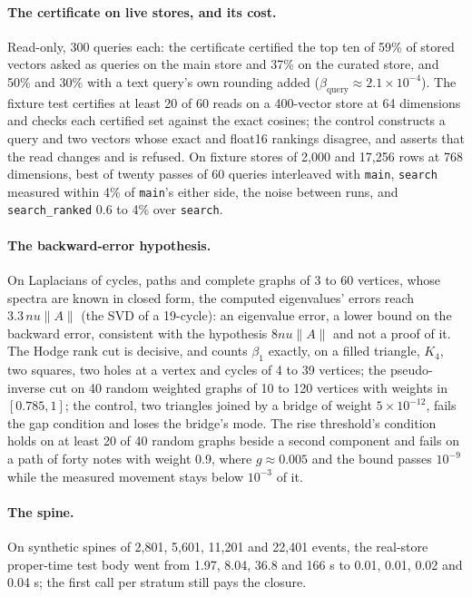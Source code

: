 \documentclass[11pt]{article}
\theoremstyle{plain}
\theoremstyle{definition}
\theoremstyle{remark}
\newcommand{\norm}[1]{\lVert #1 \rVert}
\newcommand{\betaQ}{\beta_{\mathrm{query}}}
\begin{document}
\paragraph{The certificate on live stores, and its cost.} Read-only, 300 queries each: the
certificate certified the top ten of 59\% of stored vectors asked as queries on the main store
and 37\% on the curated store, and 50\% and 30\% with a text query's own rounding added
($\betaQ \approx 2.1\times 10^{-4}$). The fixture test certifies at least 20 of 60 reads on a
400-vector store at 64 dimensions and checks each certified set against the exact cosines; the
control constructs a query and two vectors whose exact and float16 rankings disagree, and asserts
that the read changes and is refused. On fixture stores of 2,000 and 17,256 rows at 768
dimensions, best of twenty passes of 60 queries interleaved with \texttt{main}, \texttt{search}
measured within 4\% of \texttt{main}'s either side, the noise between runs, and
\texttt{search\_ranked} 0.6 to 4\% over \texttt{search}.

\paragraph{The backward-error hypothesis.} On Laplacians of cycles, paths and complete graphs of
3 to 60 vertices, whose spectra are known in closed form, the computed eigenvalues' errors reach
$3.3\,nu\norm{A}$ (the SVD of a 19-cycle): an eigenvalue error, a lower bound on the backward
error, consistent with the hypothesis $8nu\norm{A}$ and not a proof of it. The Hodge rank cut is
decisive, and counts $\beta_1$ exactly, on a filled triangle, $K_4$, two squares, two holes at a
vertex and cycles of 4 to 39 vertices; the pseudo-inverse cut on 40 random weighted graphs of 10
to 120 vertices with weights in $[0.785, 1]$; the control, two triangles joined by a bridge of
weight $5\times 10^{-12}$, fails the gap condition and loses the bridge's mode. The rise
threshold's condition holds on at least 20 of 40 random graphs beside a second component and
fails on a path of forty notes with weight 0.9, where $g \approx 0.005$ and the bound passes
$10^{-9}$ while the measured movement stays below $10^{-3}$ of it.

\paragraph{The spine.} On synthetic spines of 2,801, 5,601, 11,201 and 22,401 events, the
real-store proper-time test body went from 1.97, 8.04, 36.8 and 166 s to 0.01, 0.01, 0.02 and
0.04 s; the first call per stratum still pays the closure.
\end{document}
